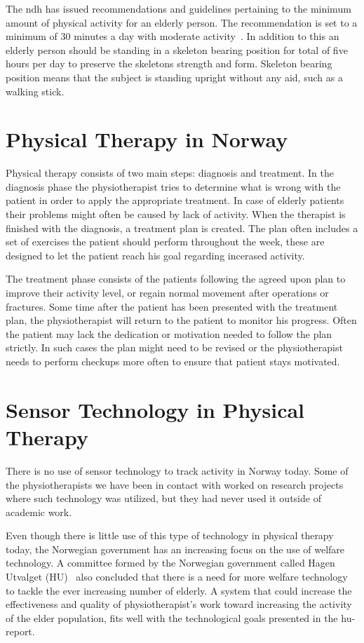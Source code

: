 The \gls{ndh} has issued recommendations and guidelines pertaining to the minimum amount of physical activity for an elderly person. The recommendation is set to a minimum of 30 minutes a day with moderate activity~\cite{helsedirektoratetFysiskAktivitet}. In addition to this an elderly person should be standing in a skeleton bearing position for total of five hours per day to preserve the skeletons strength and form. Skeleton bearing position means that the subject is standing upright without any aid, such as a walking stick.

\section{Physical Therapy in Norway}
Physical therapy consists of two main steps: diagnosis and treatment. In the diagnosis phase the physiotherapist tries to determine what is wrong with the patient in order to apply the appropriate treatment. In case of elderly patients their problems might often be caused by lack of activity. When the therapist is finished with the diagnosis, a treatment plan is created. The plan often includes a set of exercises the patient should perform throughout the week, these are designed to let the patient reach his goal regarding incerased activity.

The treatment phase consists of the patients following the agreed upon plan to improve their activity level, or regain normal movement after operations or fractures. Some time after the patient has been presented with the treatment plan, the physiotherapist will return to the patient to monitor his progress. Often the patient may lack the dedication or motivation needed to follow the plan strictly. In such cases the plan might need to be revised or the physiotherapist needs to perform checkups more often to ensure that patient stays motivated.

\section{Sensor Technology in Physical Therapy}
There is no use of sensor technology to track activity in Norway today. Some of the physiotherapists we have been in contact with worked on research projects where such technology was utilized, but they had never used it outside of academic work.

Even though there is little use of this type of technology in physical therapy today, the Norwegian government has an increasing focus on the use of welfare technology. A committee formed by the Norwegian government called Hagen Utvalget (HU)~\cite{haagen} also concluded that there is a need for more welfare technology to tackle the ever increasing number of elderly. A system that could increase the effectiveness and quality of physiotherapist's work toward increasing the activity of the elder population, fits well with the technological goals presented in the \gls{hu}-report.  

